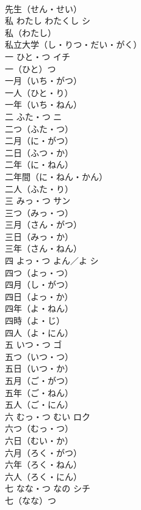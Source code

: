 \documentclass[8pt]{extreport}
\begin{document}
\begin{CJK}{UTF8}{min}
\\	先生（せん・せい）　
\\	私	わたし わたくし	シ	
\\	私（わたし） 
\\	私立大学（し・りつ・だい・がく） 
\\	一	ひと・つ	イチ	
\\	一（ひと）つ　
\\	一月（いち・がつ）　
\\	一人（ひと・り）　
\\	一年（いち・ねん）　
\\	二	ふた・つ	ニ	
\\	二つ（ふた・つ）　
\\	二月（に・がつ）　
\\	二日（ふつ・か）　
\\	二年（に・ねん）　
\\	二年間（に・ねん・かん）　
\\	二人（ふた・り）　
\\	三	みっ・つ	サン	
\\	三つ（みっ・つ）　
\\	三月（さん・がつ）　
\\	三日（みっ・か）　
\\	三年（さん・ねん）　
\\	四	よっ・つ よん／よ	シ	
\\	四つ（よっ・つ）　
\\	四月（し・がつ）　
\\	四日（よっ・か）　
\\	四年（よ・ねん）　
\\	四時（よ・じ）　
\\	四人（よ・にん）　
\\	五	いつ・つ	ゴ	
\\	五つ（いつ・つ）　
\\	五日（いつ・か）　
\\	五月（ご・がつ）　
\\	五年（ご・ねん）　
\\	五人（ご・にん）　
\\	六	むっ・つ むい	ロク	
\\	六つ（むっ・つ）　
\\	六日（むい・か）　
\\	六月（ろく・がつ）　
\\	六年（ろく・ねん）　
\\	六人（ろく・にん）　
\\	七	なな・つ なの	シチ	
\\	七（なな）つ　

\end{CJK}
\end{document}
